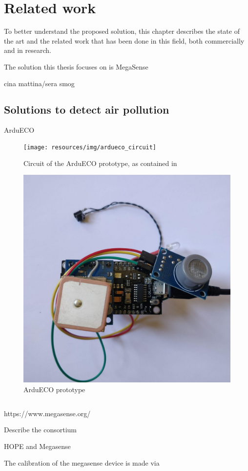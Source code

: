 
\chapter{Related work}\label{chapter:related_work}

	To better understand the proposed solution, this chapter describes the state of the art and the related work that has been done in this field, both commercially and in research.
	
	
	
	
	
	The solution this thesis focuses on is MegaSense
	
	cina mattina/sera smog
	
	\section{Solutions to detect air pollution}
	
	
	ArduECO
	
	\begin{figure}
		\centering
		\texttt{[image: resources/img/ardueco\_circuit]}
		\caption{Circuit of the ArduECO prototype, as contained in \cite{ardueco_paper}}
	\end{figure}
	
	\begin{figure}
		\centering
		\includegraphics[width=.5\textwidth]{resources/img/ardueco_picture}
		\caption{ArduECO prototype}
	\end{figure}
	
	\section{\megasense}\label{sec:megasense}
	
	
	https://www.megasense.org/
	
	Describe the consortium
	
	HOPE and Megasense
	
	The calibration of the megasense device is made via